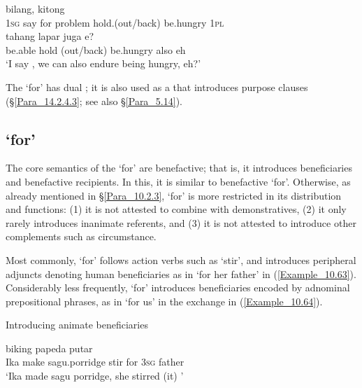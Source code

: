 \ea
\label{Example_10.62}
 {{bilang,}} {} {{}} {{}} {} {kitong}\\ %
 \textsc{1sg}  {say}  for  {problem}  {hold.(out/back)}  be.hungry  \textsc{1pl}\\
  {tahang}  {lapar}  juga  {e?}\\
 {be.able}  {hold (out/back)}  {be.hungry}  also  {eh}\\
\glt 
‘I say , we can also endure being hungry, eh?’ \textstyleExampleSource{[081025-009a-Cv.0118]}
\z


The   ‘for’ has dual ; it is also used as a  that introduces purpose clauses (§\ref{Para_14.2.4.3}; see also §\ref{Para_5.14}).


\subsection{ ‘for’}
\label{Para_10.2.4}
The core semantics of the   ‘for’ are benefactive; that is, it introduces beneficiaries and benefactive recipients. In this, it is similar to benefactive  ‘for’. Otherwise, as already mentioned in §\ref{Para_10.2.3},  ‘for’ is more restricted in its distribution and functions: (1) it is not attested to combine with demonstratives, (2) it only rarely introduces inanimate referents, and (3) it is not attested to introduce other complements such as circumstance.



Most commonly,  ‘for’ follows  action verbs such as  ‘stir’, and introduces peripheral adjuncts denoting human beneficiaries as in  ‘for her father’ in (\ref{Example_10.63}). Considerably less frequently,  ‘for’ introduces beneficiaries encoded by adnominal prepositional phrases, as in  ‘for us’ in the exchange in (\ref{Example_10.64}).


\begin{styleExampleTitle}
Introducing animate beneficiaries
\end{styleExampleTitle}

\ea
\label{Example_10.63}
 {biking} {papeda} {putar} {} {} {}\\ %
 Ika  make  sagu.porridge  stir  for  \textsc{3sg}  father\\
\glt 
‘Ika made sagu porridge, she stirred (it) ’ \textstyleExampleSource{[081006-032-Cv.0071]}
\z

